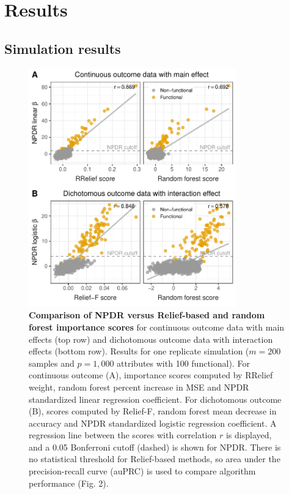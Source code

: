 \documentclass[10pt]{article}
\begin{document}

\section{Results}
\subsection{Simulation results} 

\begin{figure}[!tbp]
\centerline{\includegraphics[trim = 0 0 0 0, width=0.8\textwidth]{../figs/fig1.pdf}}
\caption{{\bf Comparison of NPDR versus Relief-based and random forest importance scores} for continuous outcome data with main effects (top row) and dichotomous outcome data with interaction effects (bottom row). Results for one replicate simulation ($m = 200$ samples and $p = 1,000$ attributes with 100 functional). For continuous outcome (A), importance scores computed by RRelief weight, random forest percent increase in MSE and NPDR standardized linear regression coefficient. For dichotomous outcome (B), scores computed by Relief-F, random forest mean decrease in accuracy and NPDR standardized logistic regression coefficient. A regression line between the scores with correlation $r$ is displayed, and a 0.05 Bonferroni cutoff (dashed) is shown for NPDR. There is no statistical threshold for Relief-based methods, so area under the precision-recall curve (auPRC) is used to compare algorithm performance (Fig. 2).}
\label{fig:npdr_relief}
\end{figure}
\end{document}
